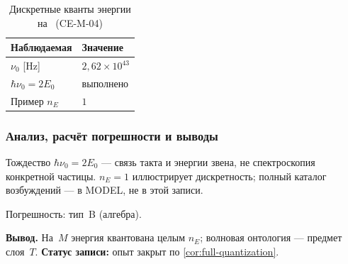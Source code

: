 \begin{table}[htbp]
\centering
\small
\caption{Дискретные кванты энергии на \Mlayer\ (CE-M-04)}
\label{tab:exp-ce-m-04}
\begin{tabular}{@{}ll@{}}
\toprule
Наблюдаемая & Значение \\
\midrule
$\nu_0$ [Hz] & $2{,}62\times 10^{43}$ \\
$\hbar\nu_0=2E_0$ & выполнено \\
Пример $n_E$ & $1$ \\
\bottomrule
\end{tabular}
\end{table}

\subsubsection*{Анализ, расчёт погрешности и выводы}
Тождество $\hbar\nu_0=2E_0$ --- связь такта и энергии звена, не спектроскопия конкретной частицы.
$n_E=1$ иллюстрирует дискретность; полный каталог возбуждений --- в MODEL, не в этой записи.

Погрешность: тип~B (алгебра).

\textbf{Вывод.}
На~$M$ энергия квантована целым $n_E$; волновая онтология --- предмет слоя~$T$.
\textbf{Статус записи:} опыт закрыт по \cref{cor:full-quantization}.
